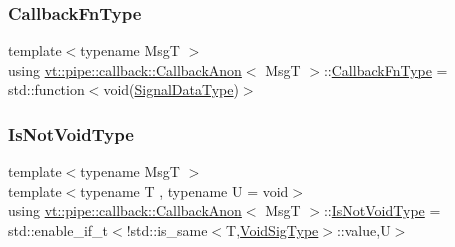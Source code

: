 \subsubsection{\texorpdfstring{Callback\+Fn\+Type}{CallbackFnType}}
{\footnotesize\ttfamily template$<$typename MsgT $>$ \\
using \hyperlink{structvt_1_1pipe_1_1callback_1_1_callback_anon}{vt\+::pipe\+::callback\+::\+Callback\+Anon}$<$ MsgT $>$\+::\hyperlink{structvt_1_1pipe_1_1callback_1_1_callback_anon_a2532c5d78c1fb298d4a369aae7b45e85}{Callback\+Fn\+Type} =  std\+::function$<$void(\hyperlink{structvt_1_1pipe_1_1callback_1_1_callback_anon_ac503b95feb44bb0b60c1d69e1ed29074}{Signal\+Data\+Type})$>$}

\mbox{\label{structvt_1_1pipe_1_1callback_1_1_callback_anon_a91e58fe2f8165c826cecedde7e4535cf}} 
\subsubsection{\texorpdfstring{Is\+Not\+Void\+Type}{IsNotVoidType}}
{\footnotesize\ttfamily template$<$typename MsgT $>$ \\
template$<$typename T , typename U  = void$>$ \\
using \hyperlink{structvt_1_1pipe_1_1callback_1_1_callback_anon}{vt\+::pipe\+::callback\+::\+Callback\+Anon}$<$ MsgT $>$\+::\hyperlink{structvt_1_1pipe_1_1callback_1_1_callback_anon_a91e58fe2f8165c826cecedde7e4535cf}{Is\+Not\+Void\+Type} =  std\+::enable\+\_\+if\+\_\+t$<$!std\+::is\+\_\+same$<$T,\hyperlink{structvt_1_1pipe_1_1callback_1_1_callback_anon_a37f2e8be7b6c014a2a33232b678a05cc}{Void\+Sig\+Type}$>$\+::value,U$>$}

\mbox{\label{structvt_1_1pipe_1_1callback_1_1_callback_anon_a3aa19d4a1044d57ba4af22015331c20a}} 
